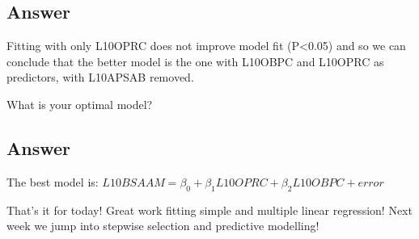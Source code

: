 \documentclass[
  10pt,
  letterpaper,
  DIV=11,
  numbers=noendperiod]{scrartcl}
\begin{document}
\hypertarget{answer-17}{%
\subsection{Answer}\label{answer-17}}

Fitting with only L10OPRC does not improve model fit (P\textless0.05)
and so we can conclude that the better model is the one with L10OBPC and
L10OPRC as predictors, with L10APSAB removed.

\begin{tcolorbox}[enhanced jigsaw, rightrule=.15mm, coltitle=black, leftrule=.75mm, titlerule=0mm, breakable, toprule=.15mm, bottomtitle=1mm, colback=white, toptitle=1mm, opacitybacktitle=0.6, bottomrule=.15mm, arc=.35mm, left=2mm, title=\textcolor{quarto-callout-warning-color}{\faExclamationTriangle}\hspace{0.5em}{Question 6}, colbacktitle=quarto-callout-warning-color!10!white, opacityback=0, colframe=quarto-callout-warning-color-frame]

What is your optimal model?

\end{tcolorbox}

\hypertarget{answer-18}{%
\subsection{Answer}\label{answer-18}}

The best model is:
\(L10BSAAM = \beta_0 + \beta_1 L10OPRC + \beta_2 L10OBPC + error\)

That's it for today! Great work fitting simple and multiple linear
regression! Next week we jump into stepwise selection and predictive
modelling!
\end{document}
